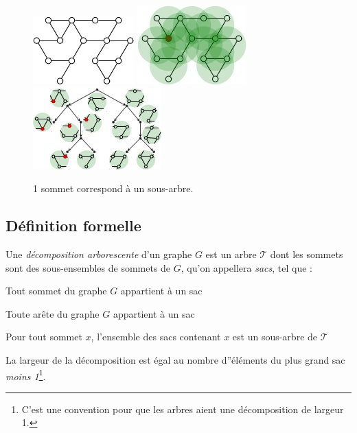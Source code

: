 \documentclass[a4paper,12pt]{article}
\theoremstyle{definition}
\theoremstyle{remark}
\begin{document}
\begin{figure}[h]
  \centering
  \begin{center}
    \includegraphics[width=.25\textwidth]{dessins/graphtw.jpg}
    \quad 
    \includegraphics[width=.25\textwidth]{dessins/graphtwbags1vertex.jpg}
    \quad 
    \includegraphics[width=.25\textwidth]{dessins/graphtw1subtree.jpg}
  \end{center}
  \caption{1 sommet correspond à un sous-arbre.}
\end{figure}

\subsection*{Définition formelle}
\label{sec:definition-formelle}

Une \emph{décomposition arborescente} d'un graphe $G$ est un arbre
$\mathcal{T}$ dont les sommets sont des sous-ensembles de sommets de $G$, qu'on
appellera \emph{sacs}, tel que :
\begin{compactitem}
\item Tout sommet du graphe $G$ appartient à un sac
\item Toute arête du graphe $G$ appartient à un sac
\item Pour tout sommet $x$, l'ensemble des sacs contenant $x$ est un
  sous-arbre de $\mathcal{T}$
\end{compactitem}
La largeur de la décomposition est égal au nombre d''éléments du plus
grand sac \emph{moins 1}\footnote{C'est une convention pour que les arbres aient une
  décomposition de largeur 1.}.
\end{document}
